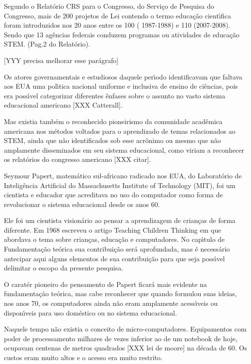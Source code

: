 \documentclass[
12pt,		%
openright,	%
twoside,  %
a4paper,			%
chapter=TITLE,		%
english,			%
french,				%
spanish,			%
brazil				%
]{USPSC-classe/USPSC}
\begin{document}
Segundo o Relat\'orio CRS para o Congresso, do Servi\c{c}o de Pesquisa do Congresso, mais de 200 projetos de Lei contendo o termo \textquotedbl  educa\c{c}\~ao cient\'{\i}fica \textquotedbl  foram introduzidos nos 20 anos entre os 100 ( 1987-1988) e 110 (2007-2008). Sendo que 13 ag\^encias federais conduzem programas ou atividades de educa\c{c}\~ao STEM. (Pag.2 do Relat\'orio). 


[YYY precisa melhorar esse par\'agrafo]


Os atores governamentais e estudiosos daquele per\'{\i}odo identificavam que faltava aos EUA uma pol\'{\i}tica nacional uniforme e inclusiva de ensino de ci\^encias, pois era poss\'{\i}vel categorizar diferentes \^enfases sobre o assunto no vasto sistema educacional americano [XXX Catterall].


Mas existia tamb\'em o reconhecido pioneirismo da comunidade acad\^emica americana nos m\'etodos voltados para o aprendizado de temas relacionados ao STEM, ainda que n\~ao identificados sob esse acr\^onimo ou mesmo que n\~ao amplamente disseminados em seu sistema educacional, como viriam a reconhecer os relat\'orios do congresso americano [XXX citar]. 


Seymour Papert, matem\'atico sul-africano radicado nos EUA, do Laborat\'orio de Intelig\^encia Artificial do Massachusetts Institute of Technology (MIT), foi um  cientista e educador que acreditava  no  uso do computador como forma de revolucionar o sistema  educacional  desde os anos 60.


Ele foi um cientista vision\'ario ao pensar a aprendizagem de crian\c{c}as de forma diferente. Em 1968 escreveu o artigo \textquotedbl  Teaching Children Thinking \textquotedbl   em que abordava  o tema sobre crian\c{c}as, educa\c{c}\~ao e computadores. No cap\'{\i}tulo de Fundamenta\c{c}\~ao te\'orica sua contribui\c{c}\~ao ser\'a aprofundada, mas \'e necess\'ario antecipar aqui alguns elementos de sua contribui\c{c}\~ao para que seja poss\'{\i}vel delimitar o escopo da presente pesquisa.


O carat\'er pioneiro do pensamento de Papert ficar\'a mais evidente na fundamenta\c{c}\~ao te\'orica, mas cabe reconhecer que quando formulou suas ideias, nos anos 70, os computadores  ainda n\~ao eram amplamente acess\'{\i}veis ou dispon\'{\i}veis para uso dom\'estico ou no sistema educacional.


Naquele tempo n\~ao existia o conceito de \textquotedbl micro-computadores\textquotedbl . Equipamentos com poder de processamento milhares de vezes inferior ao de um notebook de hoje, ocupavam centenas de metros quadrados [XXX lei de moore] na d\'ecada de 60. Os custos eram muito altos e o acesso era muito restrito.
\end{document}
